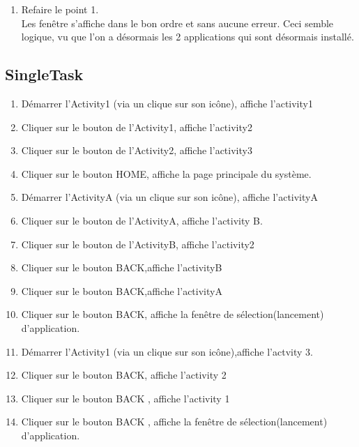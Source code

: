 \begin{enumerate}
\item Refaire le point 1. \\
Les fenêtre s'affiche dans le bon ordre et sans aucune erreur. Ceci semble logique, vu que l'on a désormais les 2 applications qui sont désormais installé. 
	\end{enumerate}


	\subsection{SingleTask}
			\begin{enumerate}
			\item Démarrer l'Activity1 (via un clique sur son icône), affiche l'activity1
			\item Cliquer sur le bouton de l’Activity1, affiche l'activity2
			\item Cliquer sur le bouton de l’Activity2, affiche l'activity3
			\item Cliquer sur le bouton HOME, affiche la page principale du système.
			\item Démarrer l'ActivityA (via un clique sur son icône), affiche l'activityA
			\item Cliquer sur le bouton de l’ActivityA, affiche l'activity B.
			\item  Cliquer sur le bouton de l’ActivityB, affiche l'activity2
			\item Cliquer sur le bouton BACK,affiche l'activityB
			\item Cliquer sur le bouton BACK,affiche l'activityA
			\item Cliquer sur le bouton BACK, affiche la fenêtre de sélection(lancement) d'application.
			\item Démarrer l'Activity1 (via un clique sur son icône),affiche l'actvity 3.
			\item Cliquer sur le bouton BACK, affiche l'activity 2
			\item Cliquer sur le bouton BACK , affiche l'activity 1
			\item Cliquer sur le bouton BACK , affiche la fenêtre de sélection(lancement) d'application.
			\end{enumerate}
			

